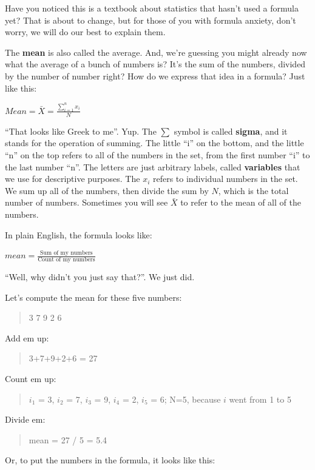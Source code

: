 \documentclass[]{book}
\begin{document}
Have you noticed this is a textbook about statistics that hasn't used a formula yet? That is about to change, but for those of you with formula anxiety, don't worry, we will do our best to explain them.

The \textbf{mean} is also called the average. And, we're guessing you might already now what the average of a bunch of numbers is? It's the sum of the numbers, divided by the number of number right? How do we express that idea in a formula? Just like this:

\(Mean = \bar{X} = \frac{\sum_{i=1}^{n} x_{i}}{N}\)

``That looks like Greek to me''. Yup. The \(\sum\) symbol is called \textbf{sigma}, and it stands for the operation of summing. The little ``i'' on the bottom, and the little ``n'' on the top refers to all of the numbers in the set, from the first number ``i'' to the last number ``n''. The letters are just arbitrary labels, called \textbf{variables} that we use for descriptive purposes. The \(x_{i}\) refers to individual numbers in the set. We sum up all of the numbers, then divide the sum by \(N\), which is the total number of numbers. Sometimes you will see \(\bar{X}\) to refer to the mean of all of the numbers.

In plain English, the formula looks like:

\(mean = \frac{\text{Sum of my numbers}}{\text{Count of my numbers}}\)

``Well, why didn't you just say that?''. We just did.

Let's compute the mean for these five numbers:

\begin{quote}
3 7 9 2 6
\end{quote}

Add em up:

\begin{quote}
3+7+9+2+6 = 27
\end{quote}

Count em up:

\begin{quote}
\(i_{1}\) = 3, \(i_{2}\) = 7, \(i_{3}\) = 9, \(i_{4}\) = 2, \(i_{5}\) = 6; N=5, because \(i\) went from 1 to 5
\end{quote}

Divide em:

\begin{quote}
mean = 27 / 5 = 5.4
\end{quote}

Or, to put the numbers in the formula, it looks like this:
\end{document}
